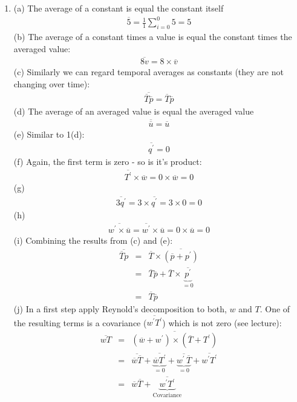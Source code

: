 \documentclass[11pt]{article}
\begin{document}
\begin{enumerate}
\item (a) The average of a constant is equal the constant itself
\begin{eqnarray*}
\overline{5} = \frac{1}{1}\sum_{i=0}^{0} 5 = 5
\end{eqnarray*}
(b) The average of a constant times a value is equal the constant times the averaged value:
\begin{eqnarray*}
\overline{8v} = 8 \times \overline{v}
\end{eqnarray*}
(c) Similarly we can regard temporal averages as constants (they are not changing over time): 
\begin{eqnarray*}
\overline{\overline{T}\overline{p}} = \overline{T}\overline{p}
\end{eqnarray*}
(d) The average of an averaged value is equal the averaged value
\begin{eqnarray*}
\overline{\overline{u}} = \overline{u}
\end{eqnarray*}
(e) Similar to 1(d):
\begin{eqnarray*}
\overline{q^{\prime}} = 0 
\end{eqnarray*}
(f) Again, the first term is zero - so is it's product:
\begin{eqnarray*}
\overline{T^{\prime}} \times \overline{w} = 0 \times \overline{w} = 0
\end{eqnarray*}
(g)
\begin{eqnarray*}
\overline{3q^{\prime}} = 3 \times \overline{q^{\prime}} = 3 \times 0 = 0
\end{eqnarray*}
(h)
\begin{eqnarray*}
\overline{w^{\prime} \times \overline{u}} = \overline{w^{\prime}} \times \overline{u} = 0 \times \overline{u} = 0 
\end{eqnarray*}
(i) Combining the results from (c) and (e): 
\begin{eqnarray*}
\overline{\overline{T}p} &=& \overline{T} \times \overline{(\overline{p}+p^{\prime})} \\
&=& \overline{T}\overline{p} + \overline{T} \times \underbrace{\overline{p^{\prime}}}_{=0} \\
&=& \overline{T}\overline{p}
\end{eqnarray*}
(j) In a first step apply Reynold's decomposition to both, $w$ and $T$. One of the resulting terms is a covariance ($\overline{w^{\prime}T^{\prime}}$) which is not zero (see lecture):
\begin{eqnarray*}
\overline{wT} &=& \overline{(\overline{w}+w^{\prime}) \times (\overline{T}+T^{\prime})} \\
&=& \overline{\overline{w}\overline{T}} + \underbrace{\overline{\overline{w} T^{\prime}}}_{=0} + \underbrace{\overline{w^{\prime}\,\overline{T}}}_{=0}  +\overline{w^{\prime}T^{\prime}}\\
&=& \overline{w}\overline{T} + \underbrace{\overline{w^{\prime}T^{\prime}}}_{\textrm{Covariance}}
\end{eqnarray*}


\end{enumerate}
\end{document}
